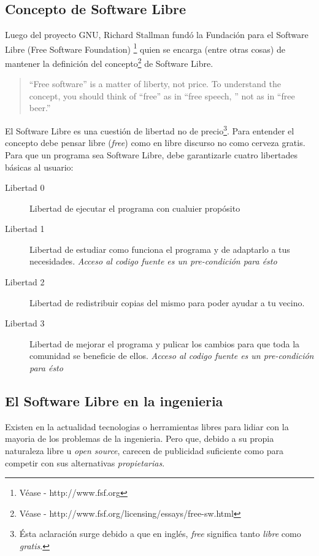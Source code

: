 \subsection{Concepto de Software Libre}
Luego del proyecto GNU, Richard Stallman fund\'o la Fundaci\'on para el 
Software Libre (Free Software Foundation)
\footnote{V\'ease - http://www.fsf.org} quien se encarga (entre otras cosas) de
mantener la definici\'on del concepto\footnote{V\'ease -
http://www.fsf.org/licensing/essays/free-sw.html} de Software Libre.

\begin{quote}
``Free software'' is a matter of liberty, not price. 
To understand the concept, you should think of ``free'' as in ``free speech,
'' not as in ``free beer.''
\end{quote}

El Software Libre es una cuesti\'on de libertad no de precio\footnote{\'Esta
aclaraci\'on surge debido a que en ingl\'es, \emph{free} significa tanto
\emph{libre} como \emph{gratis}.}. Para entender el concepto debe pensar libre
(\emph{free}) como en libre discurso no como cerveza gratis.\\

Para que un programa sea Software Libre, debe garantizarle cuatro libertades
b\'asicas al usuario:

\begin{description}
\item[Libertad 0] Libertad de ejecutar el programa con cualuier prop\'osito
\item[Libertad 1] Libertad de estudiar como funciona el programa y de
adaptarlo
a tus necesidades. \emph{Acceso al codigo fuente es un pre-condici\'on para
\'esto}
\item[Libertad 2] Libertad de redistribuir copias del mismo para poder ayudar
a tu vecino.
\item[Libertad 3] Libertad de mejorar el programa y pulicar los cambios para
que toda la comunidad se beneficie de ellos. \emph{Acceso al codigo fuente es 
un pre-condici\'on para \'esto}
\end{description}


\subsection{El Software Libre en la ingenieria} 
Existen en la actualidad tecnologias o herramientas libres para lidiar con la
mayoria de los problemas de la ingenieria. Pero que, debido a su propia
naturaleza libre u \emph{open source}, carecen de publicidad suficiente como
para competir con sus alternativas \emph{propietarias}. \\

